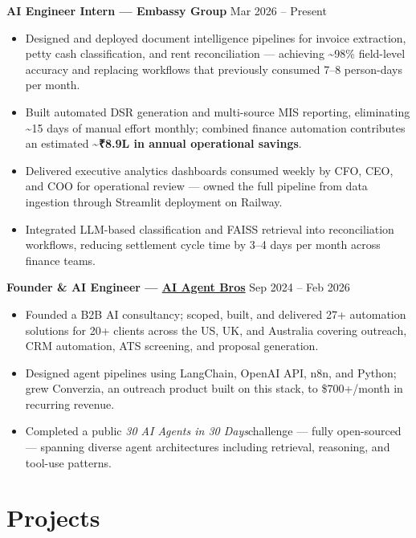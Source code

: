 \documentclass[a4paper,10pt]{article}
\newcommand{\entry}[2]{\textbf{#1} \hfill \small{#2}}
\begin{document}
\noindent\entry{AI Engineer Intern — Embassy Group}{Mar 2026 -- Present}\\[2pt]
{\small
\begin{itemize}
  \item Designed and deployed document intelligence pipelines for invoice extraction, petty cash classification, and rent reconciliation — achieving \textasciitilde98\% field-level accuracy and replacing workflows that previously consumed 7--8 person-days per month.
  \item Built automated DSR generation and multi-source MIS reporting, eliminating \textasciitilde15 days of manual effort monthly; combined finance automation contributes an estimated \textbf{\textasciitilde{}₹8.9L in annual operational savings}.
  \item Delivered executive analytics dashboards consumed weekly by CFO, CEO, and COO for operational review — owned the full pipeline from data ingestion through Streamlit deployment on Railway.
  \item Integrated LLM-based classification and FAISS retrieval into reconciliation workflows, reducing settlement cycle time by 3--4 days per month across finance teams.
\end{itemize}
}
 
\vspace{2pt}
\noindent\entry{Founder \& AI Engineer — \href{https://aiagentbros.com/}{AI Agent Bros}}{Sep 2024 -- Feb 2026}\\[2pt]
{\small
\begin{itemize}
  \item Founded a B2B AI consultancy; scoped, built, and delivered 27+ automation solutions for 20+ clients across the US, UK, and Australia covering outreach, CRM automation, ATS screening, and proposal generation.
  \item Designed agent pipelines using LangChain, OpenAI API, n8n, and Python; grew Converzia, an outreach product built on this stack, to \$700+/month in recurring revenue.
  \item Completed a public \textit{30 AI Agents in 30 Days}challenge — fully open-sourced — spanning diverse agent architectures including retrieval, reasoning, and tool-use patterns.
\end{itemize}
}
 
\section*{Projects}
 
\end{document}
